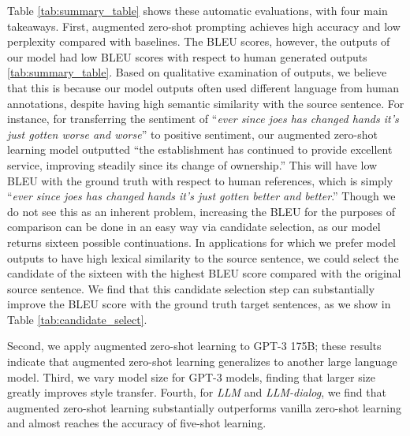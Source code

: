 Table \ref{tab:summary_table} shows these automatic evaluations, with four main takeaways. 
First, augmented zero-shot prompting achieves high accuracy and low perplexity compared with baselines. The BLEU scores, however, the outputs of our model had low BLEU scores with respect to human generated outputs \ref{tab:summary_table}. 
Based on qualitative examination of outputs, we believe that this is because our model outputs often used different language from human annotations,  despite having high semantic similarity with the source sentence.
For instance, for transferring the sentiment of ``\textit{ever since joes has changed hands it's just gotten worse and worse}'' to positive sentiment, our augmented zero-shot learning model outputted ``{the establishment has continued to provide excellent service, improving steadily since its change of ownership}.'' 
This will have low BLEU with the ground truth with respect to human references, which is simply ``\textit{ever since joes has changed hands it's just gotten better and better}.'' 
Though we do not see this as an inherent problem, increasing the BLEU for the purposes of comparison can be done in an easy way via candidate selection, as our model returns sixteen possible continuations. In applications for which we prefer model outputs to have high lexical similarity to the source sentence, we could select the candidate of the sixteen with the highest BLEU score compared with the original source sentence. 
We find that this candidate selection step can substantially improve the BLEU score with the ground truth target sentences, as we show in Table \ref{tab:candidate_select}. 



Second, we apply augmented zero-shot learning to GPT-3 175B; these results indicate that augmented zero-shot learning generalizes to another large language model.
Third, we vary model size for GPT-3 models, finding that larger size greatly improves style transfer. 
Fourth, for \textit{LLM} and \textit{LLM-dialog}, we find that augmented zero-shot learning substantially outperforms vanilla zero-shot learning and almost reaches the accuracy of five-shot learning. 


